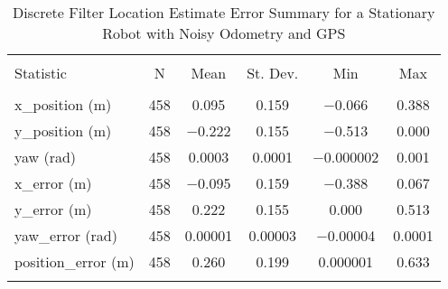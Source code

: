 
\begin{table}[htbp] \centering 
  \caption{Discrete Filter Location Estimate Error Summary for a Stationary Robot with Noisy Odometry and GPS}
  \label{tab:one_stationary_discrete_summary} 
\begin{tabular}{@{\extracolsep{5pt}}lccccc} 
\\[-1.8ex]\hline 
\hline \\[-1.8ex] 
Statistic & \multicolumn{1}{c}{N} & \multicolumn{1}{c}{Mean} & \multicolumn{1}{c}{St. Dev.} & \multicolumn{1}{c}{Min} & \multicolumn{1}{c}{Max} \\ 
\hline \\[-1.8ex] 
x\_position (m) & 458 & \num{0.095} & \num{0.159} & \num{-0.066} & \num{0.388} \\ 
y\_position (m) & 458 & \num{-0.222} & \num{0.155} & \num{-0.513} & \num{0.000} \\ 
yaw (rad) & 458 & \num{0.0003} & \num{0.0001} & \num{-0.000002} & \num{0.001} \\ 
x\_error (m) & 458 & \num{-0.095} & \num{0.159} & \num{-0.388} & \num{0.067} \\ 
y\_error (m) & 458 & \num{0.222} & \num{0.155} & \num{0.000} & \num{0.513} \\ 
yaw\_error (rad) & 458 & \num{0.00001} & \num{0.00003} & \num{-0.00004} & \num{0.0001} \\ 
position\_error (m) & 458 & \num{0.260} & \num{0.199} & \num{0.000001} & \num{0.633} \\ 
\hline \\[-1.8ex] 
\end{tabular} 
\end{table} 
